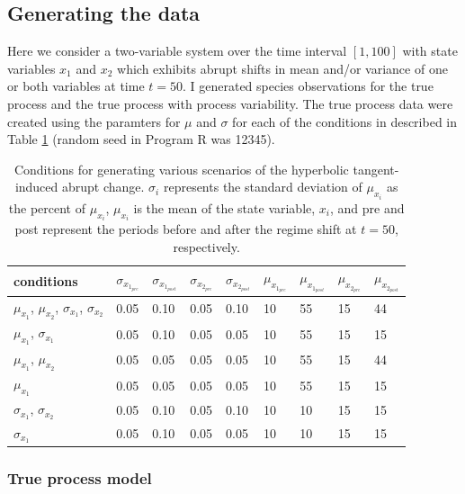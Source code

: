 \documentclass[12pt,twoside,openany]{reedthesis}
\begin{document}
\hypertarget{generating-the-data}{%
\subsection{Generating the data}\label{generating-the-data}}

Here we consider a two-variable system over the time interval \([1,100]\) with state variables \(x_1\) and \(x_2\) which exhibits abrupt shifts in mean and/or variance of one or both variables at time \(t=50\). I generated species observations for the true process and the true process with process variability. The true process data were created using the paramters for \(\mu\) and \(\sigma\) for each of the conditions in described in Table \ref{tab:sysParams} (random seed in Program R was 12345).
\begin{table}[t]

\caption{\label{tab:sysParams}Conditions for generating various scenarios of the hyperbolic tangent-induced abrupt change. $\sigma_i$ represents the standard deviation of $\mu_{x_i}$ as the percent of $\mu_{x_i}$, $\mu_{x_i}$ is the mean of the state variable, $x_i$, and pre and post represent the periods before and after the regime shift at $t=50$, respectively.}
\centering
\begin{tabular}{lllllllll}
\toprule
conditions & $\sigma_{x_{1_{pre}}}$ & $\sigma_{x_{1_{post}}}$ & $\sigma_{x_{2_{pre}}}$ & $\sigma_{x_{2_{post}}}$ & $\mu_{x_{1_{pre}}}$ & $\mu_{x_{1_{post}}}$ & $\mu_{x_{2_{pre}}}$ & $\mu_{x_{2_{post}}}$\\
\midrule
$\mu_{x_1}$, $\mu_{x_2}$, $\sigma_{x_1}$, $\sigma_{x_2}$ & 0.05 & 0.10 & 0.05 & 0.10 & 10 & 55 & 15 & 44\\
$\mu_{x_1}$, $\sigma_{x_1}$ & 0.05 & 0.10 & 0.05 & 0.05 & 10 & 55 & 15 & 15\\
$\mu_{x_1}$, $\mu_{x_2}$ & 0.05 & 0.05 & 0.05 & 0.05 & 10 & 55 & 15 & 44\\
$\mu_{x_1}$ & 0.05 & 0.05 & 0.05 & 0.05 & 10 & 55 & 15 & 15\\
$\sigma_{x_1}$, $\sigma_{x_2}$ & 0.05 & 0.10 & 0.05 & 0.10 & 10 & 10 & 15 & 15\\
\addlinespace
$\sigma_{x_1}$ & 0.05 & 0.10 & 0.05 & 0.05 & 10 & 10 & 15 & 15\\
\bottomrule
\end{tabular}
\end{table}
\hypertarget{true-process-model}{%
\subsubsection{True process model}\label{true-process-model}}
\end{document}
